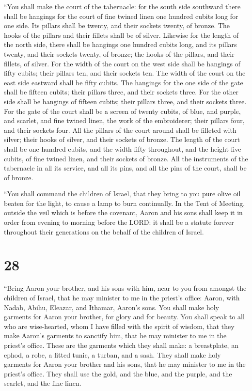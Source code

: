  ``You shall make the court of the tabernacle: for the south
side southward there shall be hangings for the court of fine twined
linen one hundred cubits long for one side.  Its pillars
shall be twenty, and their sockets twenty, of bronze. The hooks of the
pillars and their fillets shall be of silver.  Likewise for
the length of the north side, there shall be hangings one hundred cubits
long, and its pillars twenty, and their sockets twenty, of bronze; the
hooks of the pillars, and their fillets, of silver.  For
the width of the court on the west side shall be hangings of fifty
cubits; their pillars ten, and their sockets ten.  The
width of the court on the east side eastward shall be fifty cubits.
 The hangings for the one side of the gate shall be fifteen
cubits; their pillars three, and their sockets three.  For
the other side shall be hangings of fifteen cubits; their pillars three,
and their sockets three.  For the gate of the court shall
be a screen of twenty cubits, of blue, and purple, and scarlet, and fine
twined linen, the work of the embroiderer; their pillars four, and their
sockets four.  All the pillars of the court around shall be
filleted with silver; their hooks of silver, and their sockets of
bronze.  The length of the court shall be one hundred
cubits, and the width fifty throughout, and the height five cubits, of
fine twined linen, and their sockets of bronze.  All the
instruments of the tabernacle in all its service, and all its pins, and
all the pins of the court, shall be of bronze.

 ``You shall command the children of Israel, that they
bring to you pure olive oil beaten for the light, to cause a lamp to
burn continually.  In the Tent of Meeting, outside the veil
which is before the covenant, Aaron and his sons shall keep it in order
from evening to morning before the LORD: it shall be a statute forever
throughout their generations on the behalf of the children of Israel.

\hypertarget{section-27}{%
\section{28}\label{section-27}}

 ``Bring Aaron your brother, and his sons with him, near to
you from amongst the children of Israel, that he may minister to me in
the priest's office: Aaron, with Nadab, Abihu, Eleazar, and Ithamar,
Aaron's sons.  You shall make holy garments for Aaron your
brother, for glory and for beauty.  You shall speak to all
who are wise-hearted, whom I have filled with the spirit of wisdom, that
they make Aaron's garments to sanctify him, that he may minister to me
in the priest's office.  These are the garments which they
shall make: a breastplate, an ephod, a robe, a fitted tunic, a turban,
and a sash. They shall make holy garments for Aaron your brother and his
sons, that he may minister to me in the priest's office. 
They shall use the gold, and the blue, and the purple, and the scarlet,
and the fine linen.

